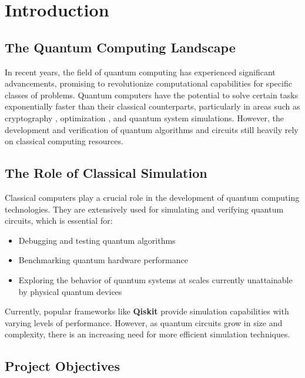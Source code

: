 \documentclass[12pt,oneside,a4paper]{article}
\begin{document}
\newpage
\tableofcontents

\newpage


\section{Introduction}

\subsection{The Quantum Computing Landscape}

In recent years, the field of quantum computing has experienced significant advancements, promising to revolutionize computational capabilities for specific classes of problems. Quantum computers have the potential to solve certain tasks exponentially faster than their classical counterparts, particularly in areas such as cryptography \cite{Shor1995PolynomialTimeAF}, optimization \cite{Farhi2014AQA}, and quantum system simulations. However, the development and verification of quantum algorithms and circuits still heavily rely on classical computing resources.

\subsection{The Role of Classical Simulation}

Classical computers play a crucial role in the development of quantum computing technologies. They are extensively used for simulating and verifying quantum circuits, which is essential for:

\begin{itemize}
    \item Debugging and testing quantum algorithms
    \item Benchmarking quantum hardware performance
    \item Exploring the behavior of quantum systems at scales currently unattainable by physical quantum devices
\end{itemize}

Currently, popular frameworks like \textbf{Qiskit} \cite{qiskit2024} provide simulation capabilities with varying levels of performance. However, as quantum circuits grow in size and complexity, there is an increasing need for more efficient simulation techniques.

\subsection{Project Objectives}
\end{document}
